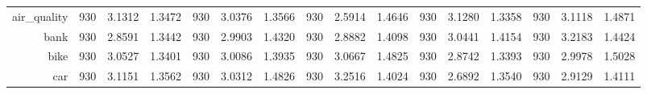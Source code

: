 \begin{table}[htbp]
{\begin{tabular}{rccccccccccccccc}
			air\_quality                        & 930                                 & 3.1312                                                                    & 1.3472          & 930                                & 3.0376                                                                             & 1.3566          & 930                                & \cellcolor[rgb]{ .776,  .937,  .808}\textcolor[rgb]{ 0,  .38,  0}{2.5914} & 1.4646          & 930                                & 3.1280                                                                    & 1.3358          & 930                                    & 3.1118                                                                    & 1.4871          \\
			bank                                & 930                                 & \cellcolor[rgb]{ .776,  .937,  .808}\textcolor[rgb]{ 0,  .38,  0}{2.8591} & 1.3442          & 930                                & 2.9903                                                                             & 1.4320          & 930                                & 2.8882                                                                    & 1.4098          & 930                                & 3.0441                                                                    & 1.4154          & 930                                    & 3.2183                                                                    & 1.4424          \\
			bike                                & 930                                 & 3.0527                                                                    & 1.3401          & 930                                & 3.0086                                                                             & 1.3935          & 930                                & 3.0667                                                                    & 1.4825          & 930                                & \cellcolor[rgb]{ .776,  .937,  .808}\textcolor[rgb]{ 0,  .38,  0}{2.8742} & 1.3393          & 930                                    & 2.9978                                                                    & 1.5028          \\
			car                                 & 930                                 & 3.1151                                                                    & 1.3562          & 930                                & 3.0312                                                                             & 1.4826          & 930                                & 3.2516                                                                    & 1.4024          & 930                                & \cellcolor[rgb]{ .776,  .937,  .808}\textcolor[rgb]{ 0,  .38,  0}{2.6892} & 1.3540          & 930                                    & 2.9129                                                                    & 1.4111          \\

\end{tabular}}
\end{table}
